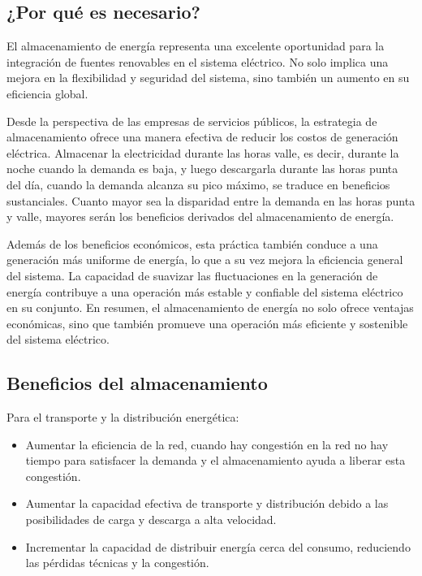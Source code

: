             \subsection{¿Por qué es necesario?}
                 El almacenamiento de energía representa una excelente oportunidad para la integración de fuentes renovables en el sistema eléctrico. No solo implica una mejora en la flexibilidad y seguridad del sistema, sino también un aumento en su eficiencia global.\par
                 Desde la perspectiva de las empresas de servicios públicos, la estrategia de almacenamiento ofrece una manera efectiva de reducir los costos de generación eléctrica. Almacenar la electricidad durante las horas valle, es decir, durante la noche cuando la demanda es baja, y luego descargarla durante las horas punta del día, cuando la demanda alcanza su pico máximo, se traduce en beneficios sustanciales. Cuanto mayor sea la disparidad entre la demanda en las horas punta y valle, mayores serán los beneficios derivados del almacenamiento de energía.\par
                 Además de los beneficios económicos, esta práctica también conduce a una generación más uniforme de energía, lo que a su vez mejora la eficiencia general del sistema. La capacidad de suavizar las fluctuaciones en la generación de energía contribuye a una operación más estable y confiable del sistema eléctrico en su conjunto. En resumen, el almacenamiento de energía no solo ofrece ventajas económicas, sino que también promueve una operación más eficiente y sostenible del sistema eléctrico.\par
                 
            \subsection{Beneficios del almacenamiento}
                 Para el transporte y la distribución energética:\par
                    
                \begin{itemize} [label=•]
                    \setlength{\itemindent}{1.5em}
                        \item Aumentar la eficiencia de la red, cuando hay congestión en la red no hay tiempo para satisfacer la demanda y el almacenamiento ayuda a liberar esta congestión.\par
                        \item Aumentar la capacidad efectiva de transporte y distribución debido a las posibilidades de carga y descarga a alta velocidad.\par
                        \item Incrementar la capacidad de distribuir energía cerca del consumo, reduciendo las pérdidas técnicas y la congestión.\par
                \end{itemize}
                    
